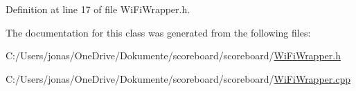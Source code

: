 Definition at line 17 of file Wi\+Fi\+Wrapper.\+h.



The documentation for this class was generated from the following files\+:\begin{DoxyCompactItemize}
\item 
C\+:/\+Users/jonas/\+One\+Drive/\+Dokumente/scoreboard/scoreboard/\hyperlink{_wi_fi_wrapper_8h}{Wi\+Fi\+Wrapper.\+h}\item 
C\+:/\+Users/jonas/\+One\+Drive/\+Dokumente/scoreboard/scoreboard/\hyperlink{_wi_fi_wrapper_8cpp}{Wi\+Fi\+Wrapper.\+cpp}\end{DoxyCompactItemize}
